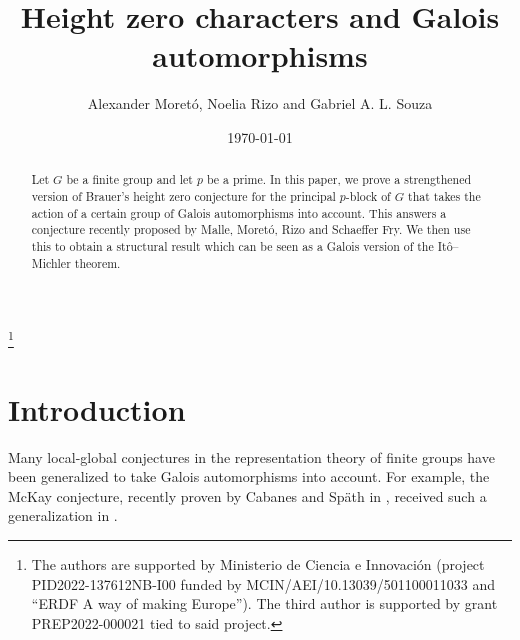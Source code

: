 \documentclass[12pt]{amsart}
\theoremstyle{theorem}
\theoremstyle{definition}
\begin{document}
\title[Height zero Galois]{Height zero characters and Galois automorphisms}



\author{Alexander Moretó, Noelia Rizo and Gabriel A. L. Souza}
\address{Departament de Matemàtiques, Universitat de València, 46100 Burjassot, València, Spain}


\thanks{The authors are supported by Ministerio de Ciencia e Innovación (project PID2022-137612NB-I00 funded by MCIN/AEI/10.13039/501100011033 and ``ERDF A way of making Europe''). The third author is supported by grant PREP2022-000021 tied to said project.}

\keywords{}


\date{\today}


\begin{abstract}
	Let $G$ be a finite group and let $p$ be a prime. In this paper, we prove a strengthened version of Brauer's height zero conjecture for the principal $p$-block of $G$ that takes the action of a certain group of Galois automorphisms into account. This answers a conjecture recently proposed by Malle, Moretó, Rizo and Schaeffer Fry. We then use this to obtain a structural result which can be seen as a Galois version of the It\^o--Michler theorem.
\end{abstract}

\maketitle



	\section{Introduction}
	
	Many local-global conjectures in the representation theory of finite groups have been generalized to take Galois automorphisms into account. For example, the McKay conjecture, recently proven by Cabanes and Späth in \cite{McKay}, received such a generalization in \cite{Galois-McKay}.
	
\end{document}
